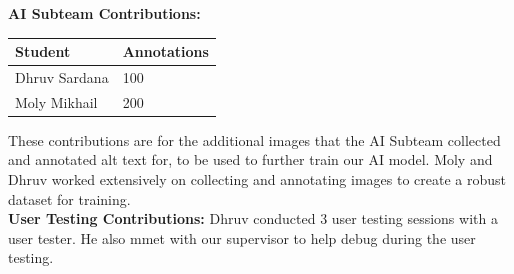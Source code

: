 \documentclass{article}
\begin{document}
\noindent\textbf{AI Subteam Contributions:}
\begin{table}[H]
\centering
\begin{tabular}{ll}
\toprule
\textbf{Student} & \textbf{Annotations}\\
\midrule
Dhruv Sardana & 100\\
Moly Mikhail & 200\\
\bottomrule
\end{tabular}
\end{table}

These contributions are for the additional images that the AI Subteam collected and annotated alt text for, to be used to further train our AI model. Moly and Dhruv worked extensively on collecting and annotating images to create a robust dataset for training. \\


\noindent\textbf{User Testing Contributions:}
Dhruv conducted 3 user testing sessions with a user tester. He also mmet with our supervisor to help debug during the user testing.
\end{document}
